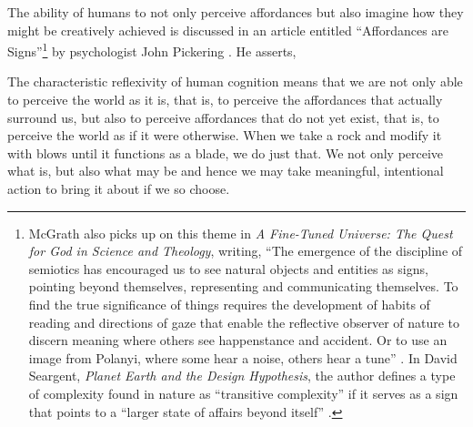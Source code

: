 The ability of humans to not only perceive affordances but also imagine
how they might be creatively achieved is discussed in an article
entitled ``Affordances are Signs''\footnote{%
McGrath also picks up on this
theme in \textit{A Fine-Tuned Universe: The Quest
for God in Science and Theology}, writing, ``The emergence of the discipline of semiotics
has encouraged us to see natural objects and entities as signs,
pointing beyond themselves, representing and communicating themselves.
To find the true significance of things requires the development of
habits of reading and directions of gaze that enable the reflective
observer of nature to discern meaning where others see happenstance and
accident. Or to use an image from Polanyi, where some hear a noise,
others hear a tune” \citep[][p.~3]{mcgrath2009}. In David Seargent, \textit{Planet Earth and the
Design Hypothesis}, the author defines a
type of complexity found in nature as “transitive complexity” if it
serves as a sign that points to a “larger state of affairs beyond
itself” \citep{seargent2007}.
} by psychologist
John Pickering \citep{pickering2007}. He asserts, 

\begin{quoting}
The characteristic reflexivity of 
human cognition means that we are not only able to perceive the world
as it is, that is, to perceive the affordances that actually surround
us, but also to perceive affordances that do not yet exist, that is, to
perceive the world as if it were otherwise. When we take a rock and
modify it with blows until it functions as a blade, we do just that. We
not only perceive what is, but also what may be and hence we may take
meaningful, intentional action to bring it about if we so choose. \citep[][p.~73]{pickering2007}
\end{quoting}


